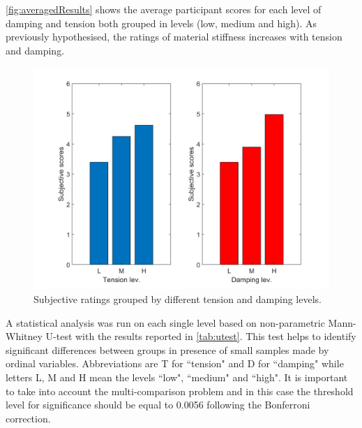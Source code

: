     \autoref{fig:averagedResults} shows the average participant scores for each level of damping and tension both grouped in levels (low, medium and high). As previously hypothesised, the ratings of material stiffness increases with tension and damping.
    \begin{figure}[t]
        \centering
    \includegraphics[width=\paperFigWidth\textwidth]{figures/tens_dump}
    \caption{Subjective ratings grouped by different tension and damping levels.}
    \centering
    \label{fig:averagedResults}
    \end{figure} 
    
    A statistical analysis was run on each single level based on non-parametric Mann-Whitney U-test with the results reported in \autoref{tab:utest}. This test helps to identify significant differences between groups in presence of small samples made by ordinal variables. Abbreviations are T for ``tension" and D for ``damping" while letters L, M and H mean the levels ``low", ``medium" and ``high". It is important to take into account the multi-comparison problem and in this case the threshold level for significance should be equal to 0.0056 following the Bonferroni correction.
    
